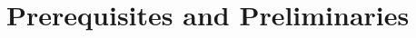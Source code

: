 \documentclass{article}
\theoremstyle{definition}
\begin{document}
    \section{Prerequisites and Preliminaries}
    \addtocounter{subsection}{6}
    
\end{document}
